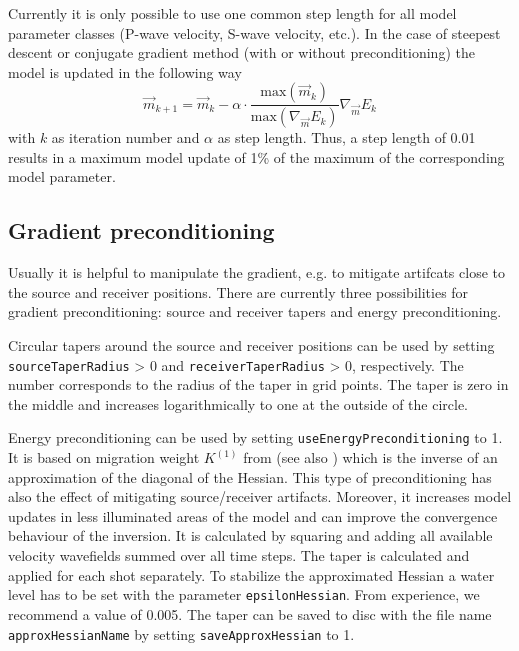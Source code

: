 \documentclass[pdftex,a4paper,parskip,listof=totoc,bibliography=totoc,onehalfspacing,12pt]{scrreprt}
\begin{document}
Currently it is only possible to use one common step length for all model parameter classes (P-wave velocity, S-wave velocity, etc.). In the case of steepest descent or conjugate gradient method (with or without preconditioning) the model is updated in the following way
\begin{equation}
 \vec{m}_{k+1} = \vec{m}_k - \alpha \cdot \frac{\mathrm{max}(\vec{m}_k)}{\mathrm{max}(\nabla_{\vec{m}} E_k)} \nabla_{\vec{m}} E_k   
\end{equation}
with $k$ as iteration number and $\alpha$ as step length. Thus, a step length of 0.01 results in a maximum model update of 1\% of the maximum of the corresponding model parameter.

\subsection{Gradient preconditioning}
\label{config:precond}

Usually it is helpful to manipulate the gradient, e.g. to mitigate artifcats close to the source and receiver positions. There are currently three possibilities for gradient preconditioning: source and receiver tapers and energy preconditioning.

Circular tapers around the source and receiver positions can be used by setting \verb+sourceTaperRadius+ > 0 and \verb+receiverTaperRadius+ > 0, respectively. The number corresponds to the radius of the taper in grid points. The taper is zero in the middle and increases logarithmically to one at the outside of the circle. 

Energy preconditioning can be used by setting \verb+useEnergyPreconditioning+ to 1. It is based on migration weight $K^{(1)}$ from \cite{plessix:04} (see also \cite{shin:01}) which is the inverse of an approximation of the diagonal of the Hessian. This type of preconditioning has also the effect of mitigating source/receiver artifacts. Moreover, it increases model updates in less illuminated areas of the model and can improve the convergence behaviour of the inversion. It is calculated by squaring and adding all available velocity wavefields summed over all time steps. The taper is calculated and applied for each shot separately. To stabilize the approximated Hessian a water level has to be set with the parameter \verb+epsilonHessian+. From experience, we recommend a value of 0.005.
The taper can be saved to disc with the file name \verb+approxHessianName+ by setting \verb+saveApproxHessian+ to 1.
\end{document}
